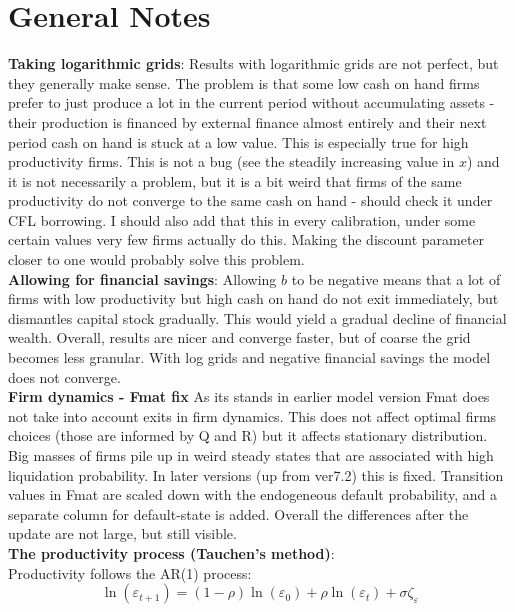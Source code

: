 \documentclass[12pt]{article}
\begin{document}
\newpage

\section*{General Notes}
\textbf{Taking logarithmic grids}: Results with logarithmic grids are not perfect, but they generally make sense. The problem is that some low cash on hand firms prefer to just produce a lot in the current period without accumulating assets - their production is financed by external finance almost entirely and their next period cash on hand is stuck at a low value. This is especially true for high productivity firms. This is not a bug (see the steadily increasing value in $x$) and it is not necessarily a problem, but it is a bit weird that firms of the same productivity do not converge to the same cash on hand - should check it under CFL borrowing. I should also add that this in every calibration, under some certain values very few firms actually do this. Making the discount parameter closer to one would probably solve this problem.   \vspace{3mm} \\
\textbf{Allowing for financial savings}:  Allowing $b$ to be negative means that a lot of firms with low productivity but high cash on hand do not exit immediately, but dismantles capital stock gradually. This would yield a gradual decline of financial wealth. Overall, results are nicer and converge faster, but of coarse the grid becomes less granular. With log grids and negative financial savings the model does not converge.  \vspace{3mm} \\
\textbf{Firm dynamics - Fmat fix} As its stands in earlier model version Fmat does not take into account exits in firm dynamics. This does not affect optimal firms choices (those are informed by Q and R) but it affects stationary distribution. Big masses of firms pile up in weird steady states that are associated with high liquidation probability. In later versions (up from ver7.2) this is fixed. Transition values in Fmat are scaled down with the endogeneous default probability, and a separate column for default-state is added. Overall the differences after the update are not large, but still visible. \vspace{3mm} \\
\textbf{The productivity process (Tauchen's method)}: \\
Productivity follows the AR(1) process:
$$ \ln(\varepsilon_{t+1}) = (1-\rho) \ln(\varepsilon_0) + \rho \ln(\varepsilon_t) + \sigma \zeta_\varepsilon $$
\end{document}
